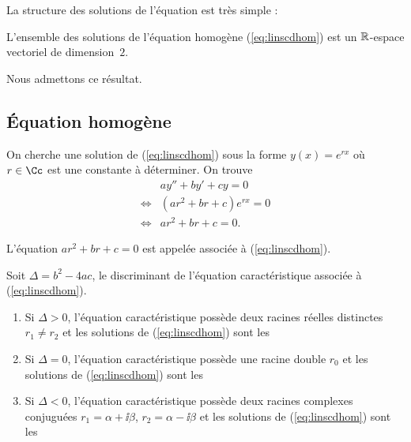 \documentclass[class=report,crop=false]{standalone}
\begin{document}
La structure des solutions de l'équation est très simple :
\begin{theoreme}
\label{th:eqdiffdim}
L'ensemble des solutions de l'équation homogène (\ref{eq:linscdhom}) est
un $\mathbb{R}$-espace vectoriel de dimension~$2$.
\end{theoreme}

Nous admettons ce résultat.


\subsection{Équation homogène}

On cherche une solution de (\ref{eq:linscdhom}) sous la forme
$y(x)=e^{rx}$ où $r \in \Cc$ est une constante à déterminer. On trouve
\begin{eqnarray*}
     & ay''+by'+cy=0 \\
\iff & (ar^2+br+c)e^{rx}=0 \\
\iff & ar^2+br+c=0.
\end{eqnarray*}

\begin{definition}
L'équation $ar^2+br+c=0$ est appelée
 associée à (\ref{eq:linscdhom}).
\end{definition}

Soit $\Delta= b^2-4ac$, le discriminant de l'équation
caractéristique associée à (\ref{eq:linscdhom}).


\begin{theoreme}
\sauteligne
\begin{enumerate}

\item Si $\Delta >0$, l'équation caractéristique possède deux racines réelles distinctes
$r_1\neq r_2$ et les solutions de (\ref{eq:linscdhom}) sont les

\item Si $\Delta=0$, l'équation caractéristique possède une racine double $r_0$
et les solutions de (\ref{eq:linscdhom}) sont les

\item Si $\Delta<0$, l'équation caractéristique possède deux racines complexes
conjuguées $r_1=\alpha+\ii \beta$, $r_2=\alpha-\ii \beta$ et les solutions de (\ref{eq:linscdhom}) sont les

\end{enumerate}
\end{theoreme}
\end{document}
